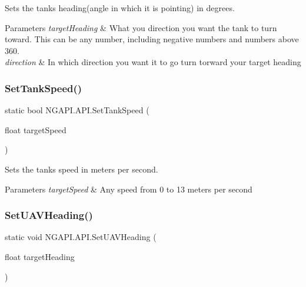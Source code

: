 Sets the tank\textquotesingle{}s heading(angle in which it is pointing) in degrees. 


\begin{DoxyParams}{Parameters}
{\em target\+Heading} & What you direction you want the tank to turn toward. This can be any number, including negative numbers and numbers above 360. \\
\hline
{\em direction} & In which direction you want it to go turn torward your target heading \\
\hline
\end{DoxyParams}
\mbox{\label{class_n_g_a_p_i_1_1_a_p_i_a44b396868d10d6182bca1b11fc1e0f65}} 
\subsubsection{\texorpdfstring{Set\+Tank\+Speed()}{SetTankSpeed()}}
{\footnotesize\ttfamily static bool N\+G\+A\+P\+I.\+A\+P\+I.\+Set\+Tank\+Speed (\begin{DoxyParamCaption}\item[{float}]{target\+Speed }\end{DoxyParamCaption})\hspace{0.3cm}{\ttfamily [static]}}



Sets the tank\textquotesingle{}s speed in meters per second. 


\begin{DoxyParams}{Parameters}
{\em target\+Speed} & Any speed from 0 to 13 meters per second \\
\hline
\end{DoxyParams}
\mbox{\label{class_n_g_a_p_i_1_1_a_p_i_a4f4b52858fe2894e7536c1de321fa894}} 
\subsubsection{\texorpdfstring{Set\+U\+A\+V\+Heading()}{SetUAVHeading()}}
{\footnotesize\ttfamily static void N\+G\+A\+P\+I.\+A\+P\+I.\+Set\+U\+A\+V\+Heading (\begin{DoxyParamCaption}\item[{float}]{target\+Heading }\end{DoxyParamCaption})\hspace{0.3cm}{\ttfamily [static]}}




